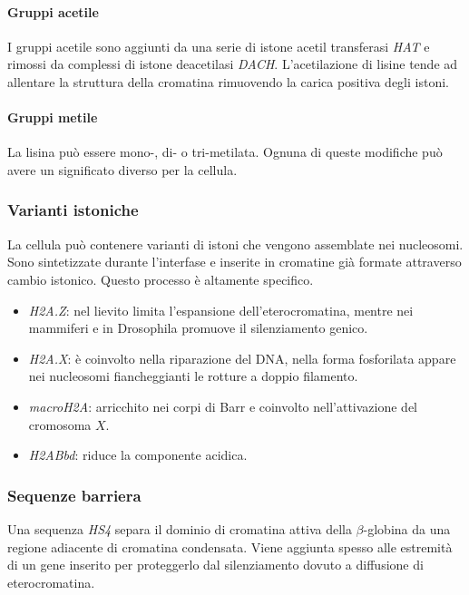 			\paragraph{Gruppi acetile}
			I gruppi acetile sono aggiunti da una serie di istone acetil transferasi \emph{HAT} e rimossi da complessi di istone deacetilasi \emph{DACH}.
			L'acetilazione di lisine tende ad allentare la struttura della cromatina rimuovendo la carica positiva degli istoni.

			\paragraph{Gruppi metile}
			La lisina pu\`o essere mono-, di- o tri-metilata.
			Ognuna di queste modifiche pu\`o avere un significato diverso per la cellula.

		\subsubsection{Varianti istoniche}
		La cellula pu\`o contenere varianti di istoni che vengono assemblate nei nucleosomi.
		Sono sintetizzate durante l'interfase e inserite in cromatine gi\`a formate attraverso cambio istonico.
		Questo processo \`e altamente specifico.
		\begin{multicols}{2}
			\begin{itemize}
				\item \emph{H2A.Z}: nel lievito limita l'espansione dell'eterocromatina, mentre nei mammiferi e in Drosophila promuove il silenziamento genico.
				\item \emph{H2A.X}: \`e coinvolto nella riparazione del DNA, nella forma fosforilata appare nei nucleosomi fiancheggianti le rotture a doppio filamento.
				\item \emph{macroH2A}: arricchito nei corpi di Barr e coinvolto nell'attivazione del cromosoma $X$.
				\item \emph{H2ABbd}: riduce la componente acidica.
			\end{itemize}
		\end{multicols}

		\subsubsection{Sequenze barriera}
		Una sequenza \emph{HS4} separa il dominio di cromatina attiva della $\beta$-globina da una regione adiacente di cromatina condensata.
		Viene aggiunta spesso alle estremit\`a di un gene inserito per proteggerlo dal silenziamento dovuto a diffusione di eterocromatina.

